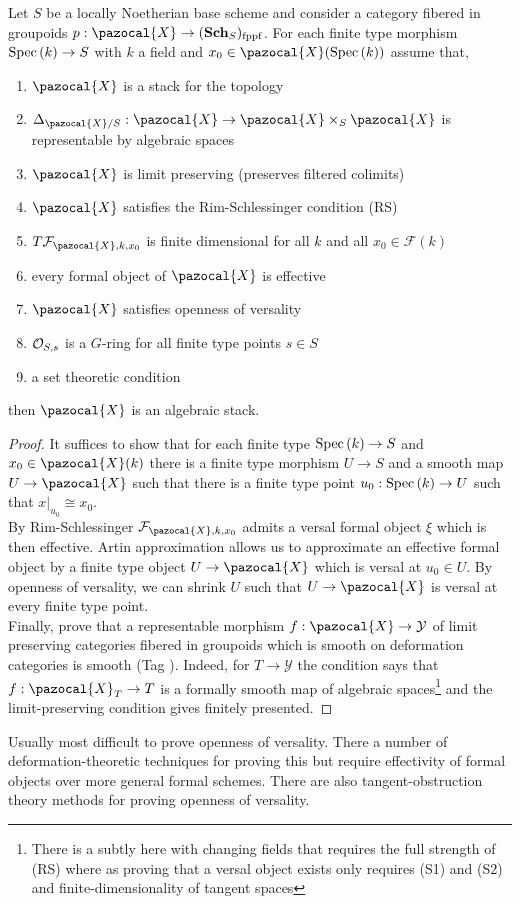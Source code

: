 \documentclass[12pt]{article}
\newcommand{\fppf}{\mathrm{fppf}}
\renewcommand{\X}{\pazocal{X}}
\newcommand{\Y}{\mathcal{Y}}
\renewcommand{\F}{\mathcal{F}}
\begin{document}
\begin{theorem}
Let $S$ be a locally Noetherian base scheme and consider a category fibered in groupoids $p : \X \to (\Sch_S)_{\fppf}$. For each finite type morphism $\mathrm{Spec}\left( k \right) \to S$ with $k$ a field and $x_0 \in \X(\Spec{k})$  assume that,
\begin{enumerate}
\item $\X$ is a stack for the \etale topology
\item $\Delta_{\X / S} : \X \to \X \times_S \X$ is representable by algebraic spaces
\item $\X$ is limit preserving (preserves filtered colimits)
\item $\X$ satisfies the Rim-Schlessinger condition (RS)
\item $T \F_{\X, k, x_0}$ is finite dimensional for all $k$ and all $x_0 \in \F(k)$
\item every formal object of $\X$ is effective
\item $\X$ satisfies openness of versality
\item $\mathcal{O}_{S, s}$ is a $G$-ring for all finite type points $s \in S$ 
\item a set theoretic condition
\end{enumerate}
then $\X$ is an algebraic stack. 
\end{theorem}

\begin{proof}
It suffices to show that for each finite type $\mathrm{Spec}\left( k \right) \to S$ and $x_0 \in \X(k)$ there is a finite type morphism $U \to S$ and a smooth map $U \to \X$ such that there is a finite type point $u_0 : \mathrm{Spec}\left( k \right) \to U$ such that $x|_{u_0} \cong x_0$.
\bigskip\\
By Rim-Schlessinger $\F_{\X, k, x_0}$ admits a versal formal object $\xi$ which is then effective. Artin approximation allows us to approximate an effective formal object by a finite type object $U \to \X$ which is versal at $u_0 \in U$. By openness of versality, we can shrink $U$ such that $U \to \X$ is versal at every finite type point.  
\bigskip\\
Finally, prove that a representable morphism $f : \X \to \Y$ of limit preserving categories fibered in groupoids which is smooth on deformation categories is smooth (Tag ). Indeed, for $T \to \Y$ the condition says that $f : \X_T \to T$ is a formally smooth map of algebraic spaces\footnote{There is a subtly here with changing fields that requires the full strength of (RS) where as proving that a versal object exists only requires (S1) and (S2) and finite-dimensionality of tangent spaces} and the limit-preserving condition gives finitely presented. 
\end{proof}

\begin{rmk}
Usually most difficult to prove openness of versality. There a number of deformation-theoretic techniques for proving this but require effectivity of formal objects over more general formal schemes. There are also tangent-obstruction theory methods for proving openness of versality.
\end{rmk}
\end{document}
